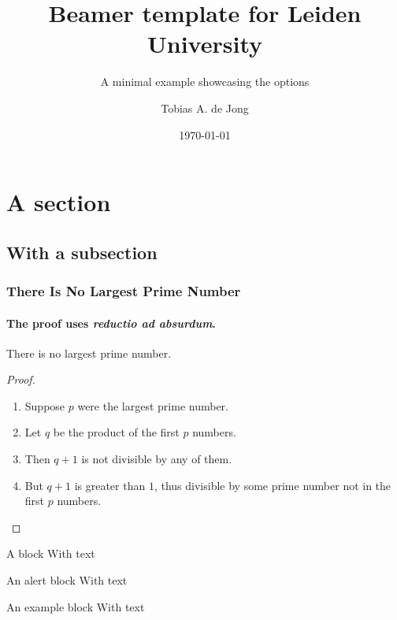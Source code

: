 \documentclass[9pt,aspectratio=169]{beamer}
\title{Beamer template for Leiden University}
\subtitle{A minimal example showcasing the options}
\author{Tobias A. de Jong}
\institute[LION]{Leiden Institute of Physics}
\date{\today}
\begin{document}
\begin{frame}
	\titlepage
\end{frame}

\begin{frame}
	\tableofcontents
\end{frame}
\section{A section}
\subsection{With a subsection}
\begin{frame}
\frametitle{There Is No Largest Prime Number}
\framesubtitle{The proof uses \textit{reductio ad absurdum}.}
\begin{theorem}
There is no largest prime number.
\end{theorem}
\begin{proof}
\begin{enumerate}
\item<1-| alert@1> Suppose $p$ were the largest prime number.
\item<2-> Let $q$ be the product of the first $p$ numbers.
\item<3-> Then $q+1$ is not divisible by any of them.
\item<1-> But $q + 1$ is greater than $1$, thus divisible by some prime
number not in the first $p$ numbers.\qedhere
\end{enumerate}
\end{proof}
\end{frame}

\begin{frame}
	\begin{block}{A block}
		With text
	\end{block}
	\begin{alertblock}{An alert block}
		With text
	\end{alertblock}
	\begin{exampleblock}{An example block}
		With text
	\end{exampleblock}
\end{frame}
\end{document}
